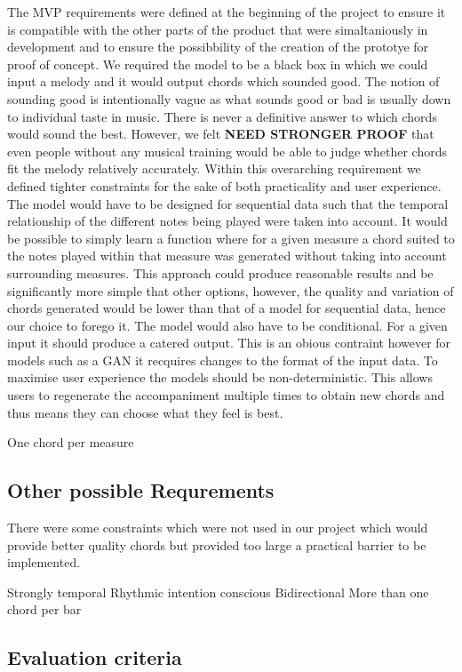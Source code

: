 The MVP requirements were defined at the beginning of the project to ensure it is compatible with the other parts of the product that were simaltaniously in development and to ensure the possibbility of the creation of the prototye for proof of concept. 
We required the model to be a black box in which we could input a melody and it would output chords which sounded good.
The notion of sounding good is intentionally vague as what sounds good or bad is usually down to individual taste in music.
There is never a definitive answer to which chords would sound the best.
However, we felt \textbf{NEED STRONGER PROOF} that even people without any musical training would be able to judge whether chords fit the melody relatively accurately.
Within this overarching requirement we defined tighter constraints for the sake of both practicality and user experience. 
The model would have to be designed for sequential data such that the temporal relationship of the different notes being played were taken into account.
It would be possible to simply learn a function where for a given measure a chord suited to the notes played within that measure was generated without taking into account surrounding measures.
This approach could produce reasonable results and be significantly more simple that other options, however, the quality and variation of chords generated would be lower than that of a model for sequential data, hence our choice to forego it.
The model would also have to be conditional. For a given input it should produce a catered output. This is an obious contraint however for models such as a GAN it recquires changes to the format of the input data.
To maximise user experience the models should be non-deterministic. This allows users to regenerate the accompaniment multiple times to obtain new chords and thus means they can choose what they feel is best.

One chord per measure
\subsection{Other possible Requrements}

There were some constraints which were not used in our project which would provide better quality chords but provided too large a practical barrier to be implemented.

Strongly temporal
Rhythmic intention conscious
Bidirectional
More than one chord per bar

\subsection{Evaluation criteria}
